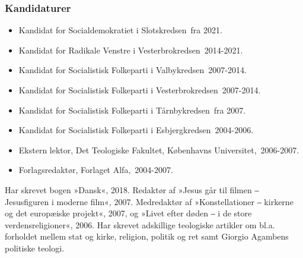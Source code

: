 \documentclass[11pt, a4paper]{awesome-cv}
\begin{document}
\begin{cvletter}
\subsubsection*{Kandidaturer}
\begin{itemize}
\item Kandidat for Socialdemokratiet i Slotskredsen fra 2021.
\item Kandidat for Radikale Venstre i Vesterbrokredsen 2014-2021.
\item Kandidat for Socialistisk Folkeparti i Valbykredsen 2007-2014.
\item Kandidat for Socialistisk Folkeparti i Vesterbrokredsen 2007-2014.
\item Kandidat for Socialistisk Folkeparti i Tårnbykredsen fra 2007.
\item Kandidat for Socialistisk Folkeparti i Esbjergkredsen 2004-2006.
\end{itemize}
\begin{itemize}
\item Ekstern lektor, Det Teologiske Fakultet, Københavns Universitet, 2006-2007.
\item Forlagsredaktør, Forlaget Alfa, 2004-2007.
\end{itemize}
Har skrevet bogen »Dansk«, 2018. Redaktør af »Jesus går til filmen ‒ Jesusfiguren i moderne film«, 2007. Medredaktør af »Konstellationer ‒ kirkerne og det europæiske projekt«, 2007, og »Livet efter døden ‒ i de store verdensreligioner«, 2006. Har skrevet adskillige teologiske artikler om bl.a. forholdet mellem stat og kirke, religion, politik og ret samt Giorgio Agambens politiske teologi.

\end{cvletter}
\end{document}
